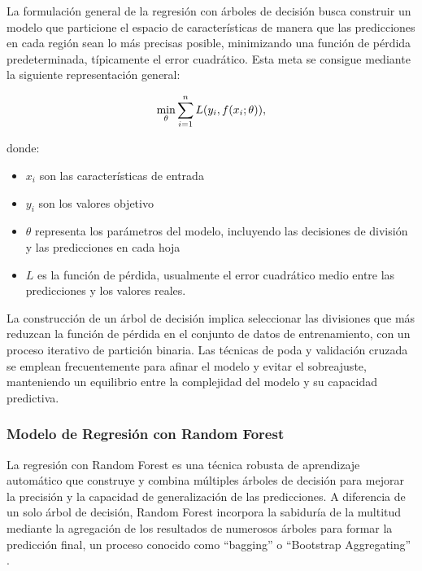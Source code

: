 \documentclass[
  11pt,
  bookmarksnumbered]{article}
\providecommand{\tightlist}{%
  \setlength{\itemsep}{0pt}\setlength{\parskip}{0pt}}
\begin{document}
La formulación general de la regresión con árboles de decisión busca construir un modelo que particione el espacio de características de manera que las predicciones en cada región sean lo más precisas posible, minimizando una función de pérdida predeterminada, típicamente el error cuadrático.
Esta meta se consigue mediante la siguiente representación general:


\begin{equation}
\large \min_{\theta} \sum_{i=1}^{n} L(y_i, f(x_i;\theta)),
\end{equation}

donde:

\begin{itemize}
\tightlist
\item
  \(x_i\) son las características de entrada
\item
  \(y_i\) son los valores objetivo
\item
  \(\theta\) representa los parámetros del modelo, incluyendo las decisiones de división y las predicciones en cada hoja
\item
  \(L\) es la función de pérdida, usualmente el error cuadrático medio entre las predicciones y los valores reales.
\end{itemize}

La construcción de un árbol de decisión implica seleccionar las divisiones que más reduzcan la función de pérdida en el conjunto de datos de entrenamiento, con un proceso iterativo de partición binaria.
Las técnicas de poda y validación cruzada se emplean frecuentemente para afinar el modelo y evitar el sobreajuste, manteniendo un equilibrio entre la complejidad del modelo y su capacidad predictiva.

\hypertarget{modelo-de-regresiuxf3n-con-random-forest}{%
\subsubsection{Modelo de Regresión con Random Forest}\label{modelo-de-regresiuxf3n-con-random-forest}}

La regresión con Random Forest es una técnica robusta de aprendizaje automático que construye y combina múltiples árboles de decisión para mejorar la precisión y la capacidad de generalización de las predicciones.
A diferencia de un solo árbol de decisión, Random Forest incorpora la sabiduría de la multitud mediante la agregación de los resultados de numerosos árboles para formar la predicción final, un proceso conocido como ``bagging'' o ``Bootstrap Aggregating'' \textcite{breiman2001random} .
\end{document}
